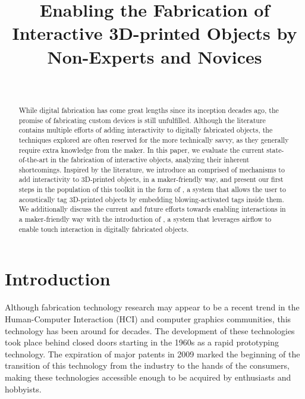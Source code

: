 


  \title{Enabling the Fabrication of Interactive 3D-printed Objects by
    Non-Experts and Novices}
  \author{%
    \\
  }

  \maketitle

  \begin{abstract}
    While digital fabrication has come great lengths since its inception
    decades ago, the promise of fabricating custom devices is still
    unfulfilled. Although the literature contains multiple efforts of adding
    interactivity to digitally fabricated objects, the techniques explored are
    often reserved for the more technically savvy, as they generally require
    extra knowledge from the maker. In this paper, we evaluate the current
    state-of-the-art in the fabrication of interactive objects, analyzing their
    inherent shortcomings. Inspired by the literature, we introduce an
    \itoolkit comprised of mechanisms to add interactivity to
    3D-printed objects, in a maker-friendly way, and present our first
    steps in the population of this toolkit in the form of \bh, a system
    that allows the user to acoustically tag 3D-printed objects by embedding
    blowing-activated tags inside them.  We additionally discuss the current
    and future efforts towards enabling interactions in a maker-friendly way
    with the introduction of \at, a system that leverages airflow to
    enable touch interaction in digitally fabricated objects.
  \end{abstract}

  \section{Introduction}    
    Although fabrication technology research may appear to be a recent trend in
    the Human-Computer Interaction (HCI) and computer graphics communities,
    this technology has been around for decades. The development of these
    technologies took place behind closed doors starting in the 1960s as a
    rapid prototyping technology. The expiration of major patents in 2009
    marked the beginning of the transition of this technology from the industry
    to the hands of the consumers, making these technologies accessible enough to be acquired by enthusiasts and hobbyists.
    
